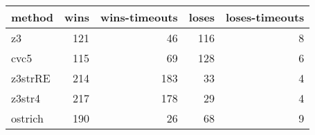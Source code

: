 \begin{tabular}{lrrrr}
\hline
 method   &   wins &   wins-timeouts &   loses &   loses-timeouts \\
\hline
 z3       &    121 &              46 &     116 &                8 \\
 cvc5     &    115 &              69 &     128 &                6 \\
 z3strRE  &    214 &             183 &      33 &                4 \\
 z3str4   &    217 &             178 &      29 &                4 \\
 ostrich  &    190 &              26 &      68 &                9 \\
\hline
\end{tabular}
